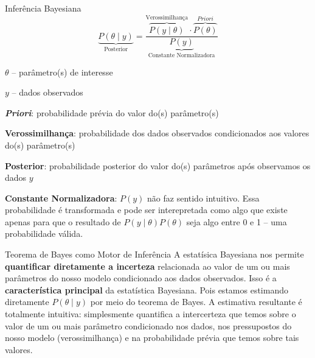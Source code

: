 \documentclass[aspectratio=169]{beamer}                    %
\begin{document}
\begin{frame}{Inferência Bayesiana}
    $$
    \underbrace{P(\theta \mid y)}_{\text{Posterior}} = \frac{\overbrace{P(y \mid  \theta)}^{\text{Verossimilhança}} \cdot \overbrace{P(\theta)}^{\textit{Priori}}}{\underbrace{P(y)}_{\text{Constante Normalizadora}}}
    $$
    \begin{vfilleditems}
        \item \footnotesize $\theta$ -- parâmetro(s) de interesse
        \item \footnotesize $y$ -- dados observados
        \item \footnotesize \textbf{\textit{Priori}}: probabilidade prévia do valor do(s) parâmetro(s)
        \item \footnotesize \textbf{Verossimilhança}: probabilidade dos dados observados condicionados aos valores do(s) parâmetro(s)
        \item \footnotesize \textbf{Posterior}: probabilidade posterior do valor do(s) parâmetros após observamos os dados $y$
        \item \footnotesize \textbf{Constante Normalizadora}: $P(y)$ não faz sentido intuitivo. Essa probabilidade é transformada e pode ser interepretada como algo que existe apenas para que o resultado de $P(y \mid \theta) P(\theta)$ seja algo entre 0 e 1 -- uma probabilidade válida.
    \end{vfilleditems}
\end{frame}

\begin{frame}{Teorema de Bayes como Motor de Inferência}
    A estatísica Bayesiana nos permite \textbf{quantificar diretamente a incerteza}
    relacionada ao valor de um ou mais parâmetros do nosso modelo condicionado aos
    dados observados. Isso é a \textbf{característica principal} da estatística
    Bayesiana. Pois estamos estimando diretamente $P(\theta \mid y)$ por meio do
    teorema de Bayes. A estimativa resultante é totalmente intuitiva:
    simplesmente quantifica a intercerteza que temos sobre o valor de um ou mais
    parâmetro condicionado nos dados, nos pressupostos do nosso modelo
    (verossimilhança) e na probabilidade prévia que temos sobre tais valores.
\end{frame}
\end{document}

